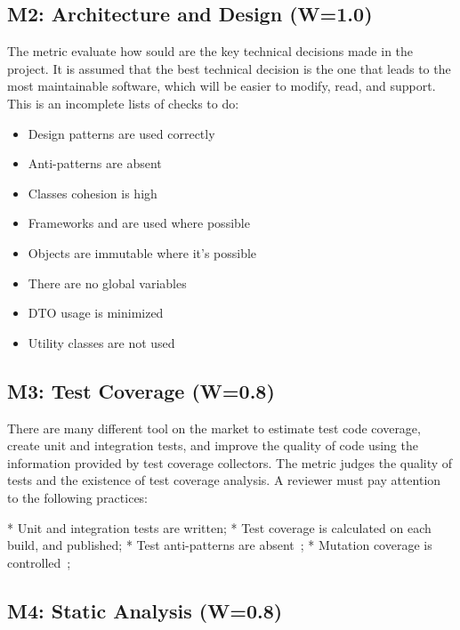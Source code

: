 \documentclass[manuscript,12pt,nonacm=true,oneside]{acmart}
\begin{document}
\subsection{M2: Architecture and Design (W=1.0)}

The metric evaluate how sould are the key technical decisions made
in the project. It is assumed that the best technical decision is the
one that leads to the most maintainable software, which will be easier
to modify, read, and support. This is an incomplete lists of
checks to do:

\begin{itemize}
\item Design patterns are used correctly~\citep{gamma1993design,holub2004holub,freeman2008head,fowler2003patterns}
\item Anti-patterns are absent~\citep{jaafar2013mining}
\item Classes cohesion is high
\item Frameworks and are used where possible
\item Objects are immutable where it's possible~\citep{yb-immutability}
\item There are no global variables~\citep{yb-global-vars}
\item DTO usage is minimized~\citep{yb-dto}
\item Utility classes are not used~\citet{yb-utility}
\end{itemize}

\subsection{M3: Test Coverage (W=0.8)}

There are many different tool on the market to estimate test code coverage,
create unit and integration tests, and improve the quality of code using
the information provided by test coverage collectors. The metric judges
the quality of tests and the existence of test coverage analysis. A reviewer
must pay attention to the following practices:

  * Unit and integration tests are written;
  * Test coverage is calculated on each build, and published;
  * Test anti-patterns are absent~\citep{yb-test-anti};
  * Mutation coverage is controlled~\citep{andrews2006using};

\subsection{M4: Static Analysis (W=0.8)}
\end{document}
